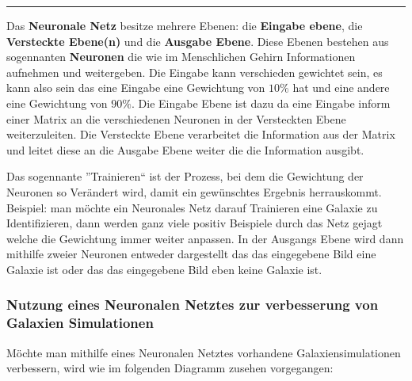 \hrule

\bigskip

Das \textbf{Neuronale Netz} besitze mehrere Ebenen: die \textbf{Eingabe ebene},
die \textbf{Versteckte Ebene(n)} und die \textbf{Ausgabe Ebene}.
Diese Ebenen bestehen aus sogennanten \textbf{Neuronen} die wie im Menschlichen
Gehirn Informationen aufnehmen und weitergeben. Die Eingabe kann verschieden
gewichtet sein, es kann also sein das eine Eingabe eine Gewichtung von
\( 10\% \) hat und eine andere eine Gewichtung von \( 90\% \).
Die Eingabe Ebene ist dazu da eine Eingabe inform einer Matrix an die
verschiedenen Neuronen in der Versteckten Ebene weiterzuleiten.
Die Versteckte Ebene verarbeitet die Information aus der Matrix und leitet
diese an die Ausgabe Ebene weiter die die Information ausgibt.
\par
Das sogennante ''Trainieren`` ist der Prozess, bei dem die Gewichtung der
Neuronen so Verändert wird, damit ein gewünschtes Ergebnis herrauskommt.
Beispiel: man möchte ein Neuronales Netz darauf Trainieren eine Galaxie zu
Identifizieren, dann werden ganz viele positiv Beispiele durch das Netz gejagt
welche die Gewichtung immer weiter anpassen. In der Ausgangs Ebene wird dann
mithilfe zweier Neuronen entweder dargestellt das das eingegebene Bild eine
Galaxie ist oder das das eingegebene Bild eben keine Galaxie ist.

\subsubsection{Nutzung eines Neuronalen Netztes zur verbesserung von Galaxien Simulationen}

Möchte man mithilfe eines Neuronalen Netztes vorhandene Galaxiensimulationen
verbessern, wird wie im folgenden Diagramm zusehen vorgegangen:


